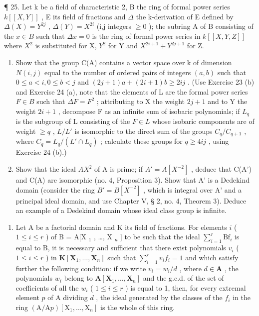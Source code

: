 ¶ 25. Let k be a field of characteristic 2, B the ring of formal power series \(k[[X,Y]]\) , E its field of fractions and \(\Delta\) the k-derivation of E defined by \(\Delta(X)=Y^{2j}\) , \(\Delta(Y)=X^{2i}\) (i,j integers \(\geqslant0\) ); the subring A of B consisting of the \(x\in B\) such that \(\Delta x=0\) is the ring of formal power series in \(k[[X,Y,Z]]\) where \(X^{2}\) is substituted for X, \(Y^{2}\) for Y and \(X^{2i+1}+Y^{2j+1}\) for Z.

\begin{enumerate}
\def\labelenumi{(\alph{enumi})}
\item
  Show that the group C(A) contains a vector space over k of dimension \(N(i,j)\) equal to the number of ordered pairs of integers \((a,b)\) such that \(0 \leqslant a < i, 0 \leqslant b < j\) and \((2j + 1)a + (2i + 1)b \geqslant 2ij\) . (Use Exercise 23 (b) and Exercise 24 (a), note that the elements of L are the formal power series \(F \in B\) such that \(\Delta F = F^{2}\) ; attributing to X the weight \(2j + 1\) and to Y the weight \(2i + 1\) , decompose F as an infinite sum of isobaric polynomials; if \(L_{q}\) is the subgroup of L consisting of the \(F \in L\) whose isobaric components are of weight \(\geqslant q\) , \(L/L'\) is isomorphic to the direct sum of the groups \(C_{q}/C_{q+1}\) , where \(C_{q} = L_{q}/(L' \cap L_{q})\) ; calculate these groups for \(q \geqslant 4ij\) , using Exercise 24 (b).)
\item
  Show that the ideal \(AX^{2}\) of A is prime; if \(A' = A[X^{-2}]\) , deduce that C(A') and C(A) are isomorphic (no. 4, Proposition 3). Show that A' is a Dedekind domain (consider the ring \(B' = B[X^{-2}]\) , which is integral over A' and a principal ideal domain, and use Chapter V, § 2, no. 4, Theorem 3). Deduce an example of a Dedekind domain whose ideal class group is infinite.
\end{enumerate}

\begin{enumerate}
\def\labelenumi{\arabic{enumi}.}
\setcounter{enumi}{25}
\tightlist
\item
  Let A be a factorial domain and K its field of fractions. For elements \(i\) ( \(1 \leqslant i \leqslant r\) ) of B = A{[}X \(_{1}\) , \ldots, X \(_{n}\) {]} to be such that the ideal \(\sum_{i=1}^{r} \text{Bf}_i\) is equal to B, it is necessary and sufficient that there exist polynomials \(v_{i}\) ( \(1 \leqslant i \leqslant r\) ) in \(\mathbf{K}[\mathbf{X}_1, \ldots, \mathbf{X}_n]\) such that \(\sum_{i=1}^{r} v_i f_i = 1\) and which satisfy further the following condition: if we write \(v_i = w_i / d\) , where \(d \in \mathbf{A}\) , the polynomials \(w_i\) belong to \(\mathbf{A}[\mathbf{X}_1, \ldots, \mathbf{X}_n]\) and the g.c.d. of the set of coefficients of all the \(w_i\) ( \(1 \leqslant i \leqslant r\) ) is equal to 1, then, for every extremal element \(p\) of A dividing \(d\) , the ideal generated by the classes of the \(f_i\) in the ring \((\mathrm{A} / \mathrm{A}p)[\mathrm{X}_1, \ldots, \mathrm{X}_n]\) is the whole of this ring.
\end{enumerate}

